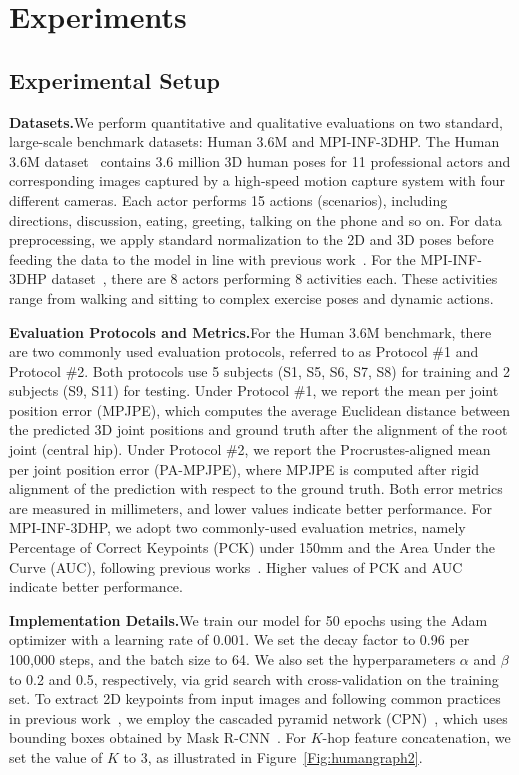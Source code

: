 \documentclass{bmvc2k}
\begin{document}
\section{Experiments}
\subsection{Experimental Setup}
\medskip\noindent\textbf{Datasets.}\quad We perform quantitative and qualitative evaluations on two standard, large-scale benchmark datasets: Human 3.6M and MPI-INF-3DHP. The Human 3.6M dataset~\cite{ionescu2013human3} contains 3.6 million 3D human poses for 11 professional actors and corresponding images captured by a high-speed motion capture system with four different cameras. Each actor performs 15 actions (scenarios), including directions, discussion, eating, greeting, talking on the phone and so on. For data preprocessing, we apply standard normalization to the 2D and 3D poses before feeding the data to the model in line with previous work~\cite{zou2020high, martinez2017simple}. For the MPI-INF-3DHP dataset~\cite{Dushyant:2017}, there are 8 actors performing 8 activities each. These activities range from walking and sitting to complex exercise poses and dynamic actions.

\medskip\noindent\textbf{Evaluation Protocols and Metrics.}\quad For the Human 3.6M benchmark, there are two commonly used evaluation protocols, referred to as Protocol \#1 and Protocol \#2. Both protocols use 5 subjects (S1, S5, S6, S7, S8) for training and 2 subjects (S9, S11) for testing. Under Protocol \#1, we report the mean per joint position error (MPJPE), which computes the average Euclidean distance between the predicted 3D joint positions and ground truth after the alignment of the root joint (central
hip). Under Protocol \#2, we report the Procrustes-aligned mean per joint position error (PA-MPJPE), where MPJPE is computed after rigid alignment of the prediction with respect to the ground truth. Both error metrics are measured in millimeters, and lower values indicate better performance. For MPI-INF-3DHP, we adopt two commonly-used evaluation metrics, namely Percentage of Correct Keypoints (PCK) under 150mm and the Area Under the Curve (AUC), following previous works~\cite{yang20183d,pavlakos2018ordinal,Habibie:19}. Higher values of PCK and AUC indicate better performance.

\medskip\noindent\textbf{Implementation Details.}\quad We train our model for 50 epochs using the Adam optimizer with a learning rate of 0.001. We set the decay factor to 0.96 per 100,000 steps, and the batch size to 64. We also set the hyperparameters $\alpha$ and $\beta$ to 0.2 and 0.5, respectively, via grid search with cross-validation on the training set. To extract 2D keypoints from input images and following common practices in previous work~\cite{pavllo20193d,zou2020high}, we employ the cascaded pyramid network (CPN)~\cite{chen2018cascaded}, which uses bounding boxes obtained by Mask R-CNN~\cite{KHe:17}. For $K$-hop feature concatenation, we set the value of $K$ to 3, as illustrated in Figure~\ref{Fig:humangraph2}.
\end{document}
